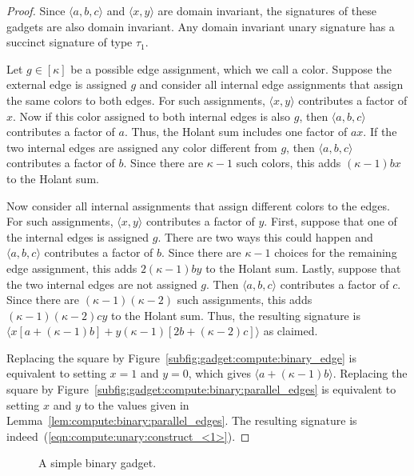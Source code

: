 \documentclass[11pt]{article}
\def\borderColor{blue!60}
\def\scale{0.6}
\def\nodeDist{1.4cm}
\begin{document}
\begin{proof}
 Since $\langle a,b,c \rangle$ and $\langle x,y \rangle$ are domain invariant,
 the signatures of these gadgets are also domain invariant.
 Any domain invariant unary signature has a succinct signature of type $\tau_1$.

 Let $g \in [\kappa]$ be a possible edge assignment,
 which we call a color.
 Suppose the external edge is assigned $g$ and consider all internal edge assignments that assign the same colors to both edges.
 For such assignments,
 $\langle x,y \rangle$ contributes a factor of $x$.
 Now if this color assigned to both internal edges is also $g$,
 then $\langle a,b,c \rangle$ contributes a factor of $a$.
 Thus, the Holant sum includes one factor of $a x$.
 If the two internal edges are assigned any color different from $g$,
 then $\langle a,b,c \rangle$ contributes a factor of $b$.
 Since there are $\kappa - 1$ such colors,
 this adds $(\kappa - 1) b x$ to the Holant sum.
 
 Now consider all internal assignments that assign different colors to the edges.
 For such assignments,
 $\langle x,y \rangle$ contributes a factor of $y$.
 First, suppose that one of the internal edges is assigned $g$.
 There are two ways this could happen and $\langle a,b,c \rangle$ contributes a factor of $b$.
 Since there are $\kappa - 1$ choices for the remaining edge assignment,
 this adds $2 (\kappa - 1) b y$ to the Holant sum.
 Lastly, suppose that the two internal edges are not assigned $g$.
 Then $\langle a,b,c \rangle$ contributes a factor of $c$.
 Since there are $(\kappa - 1) (\kappa - 2)$ such assignments,
 this adds $(\kappa - 1) (\kappa - 2) c y$ to the Holant sum.
 Thus, the resulting signature is $\langle x [a + (\kappa - 1) b] + y (\kappa - 1) [2 b + (\kappa - 2) c] \rangle$ as claimed.
 
 Replacing the square by Figure~\ref{subfig:gadget:compute:binary_edge} is equivalent to setting $x = 1$ and $y = 0$,
 which gives $\langle a + (\kappa - 1) b \rangle$.
 Replacing the square by Figure~\ref{subfig:gadget:compute:binary:parallel_edges} is equivalent to setting $x$ and $y$ to the values given in Lemma~\ref{lem:compute:binary:parallel_edges}.
 The resulting signature is indeed~(\ref{eqn:compute:unary:construct_<1>}).
\end{proof}

\begin{figure}[ht]
 \centering
 \caption{A simple binary gadget.}
 \label{fig:gadget:compute:binary:parallel_edges}
\end{figure}
\end{document}
